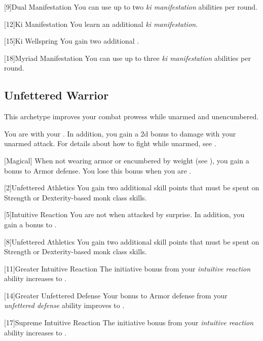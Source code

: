         [9]{Dual Manifestation} You can use up to two \textit{ki manifestation} abilities per round.

        [12]{Ki Manifestation}
        You learn an additional \textit{ki manifestation}.

        [15]{Ki Wellspring} You gain two additional .

        [18]{Myriad Manifestation} You can use up to three \textit{ki manifestation} abilities per round.

    \subsection{Unfettered Warrior}
        This archetype improves your combat prowess while unarmed and unencumbered.

        You are  with your .
        In addition, you gain a \plus2d bonus to damage with your unarmed attack.
        For details about how to fight while unarmed, see .

        [Magical]
        When not wearing armor or encumbered by weight (see ), you gain a  bonus to Armor defense.
        You lose this bonus when you are \helpless.

        [2]{Unfettered Athletics} You gain two additional skill points that must be spent on Strength or Dexterity-based monk class skills.

        [5]{Intuitive Reaction}
        You are not \unaware when attacked by surprise.
        In addition, you gain a  bonus to .

        [8]{Unfettered Athletics} You gain two additional skill points that must be spent on Strength or Dexterity-based monk class skills.

        [11]{Greater Intuitive Reaction}
        The initiative bonus from your \textit{intuitive reaction} ability increases to .

        [14]{Greater Unfettered Defense}
        Your bonus to Armor defense from your \textit{unfettered defense} ability improves to .

        [17]{Supreme Intuitive Reaction}
        The initiative bonus from your \textit{intuitive reaction} ability increases to .

